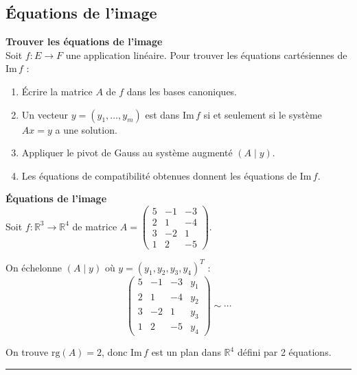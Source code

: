 \documentclass[../PolyS4.tex]{subfiles}
\begin{document}
\newpage
\subsection{Équations de l'image}

\begin{Meth}\textbf{Trouver les équations de l'image}\\

Soit $f : E \to F$ une application linéaire. Pour trouver les équations cartésiennes de $\text{Im}\, f$ :
\begin{enumerate}
    \item Écrire la matrice $A$ de $f$ dans les bases canoniques.
    \item Un vecteur $y = (y_1, \ldots, y_m)$ est dans $\text{Im}\, f$ si et seulement si le système $Ax = y$ a une solution.
    \item Appliquer le pivot de Gauss au système augmenté $(A \mid y)$.
    \item Les équations de compatibilité obtenues donnent les équations de $\text{Im}\, f$.
\end{enumerate}
\end{Meth}

\begin{Ex}\textbf{Équations de l'image}\\

Soit $f : \mathbb{R}^3 \to \mathbb{R}^4$ de matrice $A = \begin{pmatrix} 5 & -1 & -3 \\ 2 & 1 & -4 \\ 3 & -2 & 1 \\ 1 & 2 & -5 \end{pmatrix}$.

On échelonne $(A \mid y)$ où $y = (y_1, y_2, y_3, y_4)^T$ :
$$\begin{pmatrix} 5 & -1 & -3 & y_1 \\ 2 & 1 & -4 & y_2 \\ 3 & -2 & 1 & y_3 \\ 1 & 2 & -5 & y_4 \end{pmatrix} \sim \cdots$$

On trouve $\text{rg}(A) = 2$, donc $\text{Im}\, f$ est un plan dans $\mathbb{R}^4$ défini par 2 équations.
\end{Ex}

\vspace{1em}
\hrule
\vspace{1em}
\end{document}
